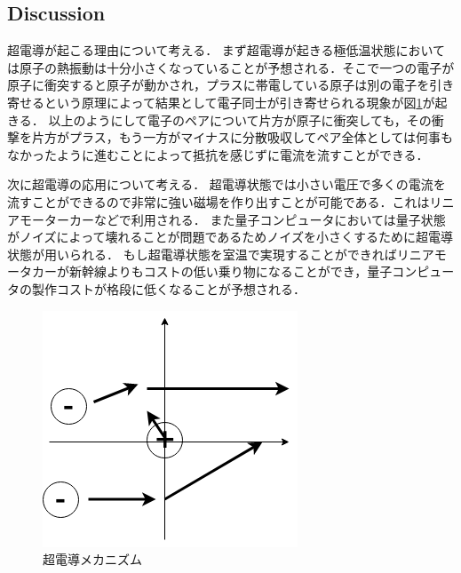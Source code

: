 \documentclass[11pt, a4paper,twocolumn]{jarticle}
\begin{document}
\subsection{Discussion}
超電導が起こる理由について考える．
まず超電導が起きる極低温状態においては原子の熱振動は十分小さくなっていることが予想される．そこで一つの電子が原子に衝突すると原子が動かされ，プラスに帯電している原子は別の電子を引き寄せるという原理によって結果として電子同士が引き寄せられる現象が図\ref{fig:40}が起きる．
以上のようにして電子のペアについて片方が原子に衝突しても，その衝撃を片方がプラス，もう一方がマイナスに分散吸収してペア全体としては何事もなかったように進むことによって抵抗を感じずに電流を流すことができる．

次に超電導の応用について考える．
超電導状態では小さい電圧で多くの電流を流すことができるので非常に強い磁場を作り出すことが可能である．これはリニアモーターカーなどで利用される．
また量子コンピュータにおいては量子状態がノイズによって壊れることが問題であるためノイズを小さくするために超電導状態が用いられる．
もし超電導状態を室温で実現することができればリニアモータカーが新幹線よりもコストの低い乗り物になることができ，量子コンピュータの製作コストが格段に低くなることが予想される．

\begin{figure}[htbp]
 \begin{center}
  \includegraphics[width=0.8\linewidth]{fig40.png}
 \end{center}
 \caption{超電導メカニズム}
 \label{fig:40}
\end{figure}
\newpage
\end{document}
